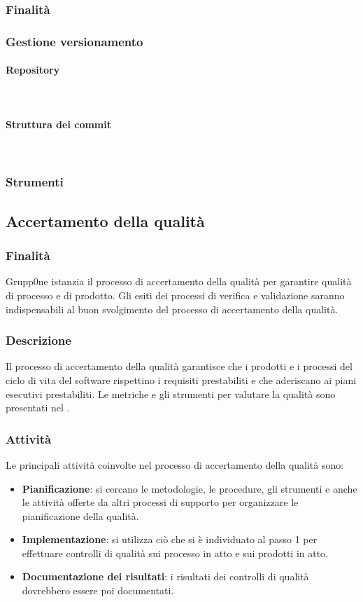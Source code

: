 \documentclass[../norme-di-progetto.tex]{subfiles}
\begin{document}
\subsubsection{Finalità}
\label{subs:finalità}
\subsubsection{Gestione versionamento}
\label{subs:gestione versionamento}
\paragraph{Repository}\mbox{}\\
\label{par:repository}
\paragraph{Struttura dei commit}\mbox{}\\
\label{par:struttura dei commit}
\subsubsection{Strumenti}
\label{subs:strumenti}
\subsection{Accertamento della qualità}
\subsubsection{Finalità}
\label{subs:finalità}
Grupp0ne istanzia il processo di accertamento della qualità per garantire qualità di processo e di prodotto. Gli esiti dei processi di verifica e validazione saranno indispensabili al buon svolgimento del processo di accertamento della qualità.
\subsubsection{Descrizione}
\label{subs:descrizione}
Il processo di accertamento della qualità garantisce che i prodotti e i processi del ciclo di vita del software rispettino i requisiti prestabiliti e che aderiscano ai piani esecutivi prestabiliti. Le metriche e gli strumenti per valutare la qualità sono presentati nel .
\subsubsection{Attività}
Le principali attività coinvolte nel processo di accertamento della qualità sono:
\begin{itemize}
	\item \textbf{Pianificazione}: si cercano le metodologie, le procedure, gli strumenti e anche le attività offerte da altri processi di supporto per organizzare le pianificazione della qualità.
	\item \textbf{Implementazione}: si utilizza ciò che si è individuato al passo 1 per effettuare controlli di qualità sui processo in atto e sui prodotti in atto.
	\item \textbf{Documentazione dei risultati}: i risultati dei controlli di qualità dovrebbero essere poi documentati.
\end{itemize}
\end{document}
